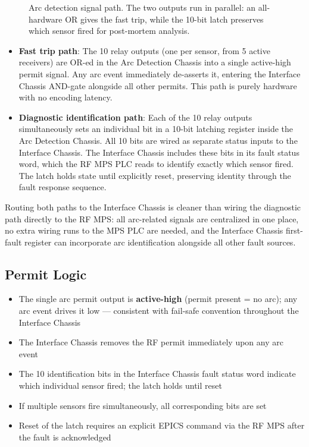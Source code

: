 \begin{figure}[tbp]
\centering
\begin{fitpicture}\end{fitpicture}
\caption{Arc detection signal path.  The two outputs run in parallel: an all-hardware OR gives the fast trip, while the 10-bit latch preserves which sensor fired for post-mortem analysis.}\label{fig:arc-detection}
\end{figure}
\begin{itemize}
\tightlist
\item
  \textbf{Fast trip path}: The 10 relay outputs (one per sensor, from 5 active receivers) are OR-ed in the Arc Detection Chassis into a single active-high permit signal. Any arc event immediately de-asserts it, entering the Interface Chassis AND-gate alongside all other permits. This path is purely hardware with no encoding latency.
\item
  \textbf{Diagnostic identification path}: Each of the 10 relay outputs simultaneously sets an individual bit in a 10-bit latching register inside the Arc Detection Chassis. All 10 bits are wired as separate status inputs to the Interface Chassis. The Interface Chassis includes these bits in its fault status word, which the RF MPS PLC reads to identify exactly which sensor fired. The latch holds state until explicitly reset, preserving identity through the fault response sequence.
\end{itemize}

Routing both paths to the Interface Chassis is cleaner than wiring the diagnostic path directly to the RF MPS: all arc-related signals are centralized in one place, no extra wiring runs to the MPS PLC are needed, and the Interface Chassis first-fault register can incorporate arc identification alongside all other fault sources.

\subsection{Permit Logic}\label{permit-logic}

\begin{itemize}
\tightlist
\item
  The single arc permit output is \textbf{active-high} (permit present = no arc); any arc event drives it low --- consistent with fail-safe convention throughout the Interface Chassis
\item
  The Interface Chassis removes the RF permit immediately upon any arc event
\item
  The 10 identification bits in the Interface Chassis fault status word indicate which individual sensor fired; the latch holds until reset
\item
  If multiple sensors fire simultaneously, all corresponding bits are set
\item
  Reset of the latch requires an explicit EPICS command via the RF MPS after the fault is acknowledged
\end{itemize}

